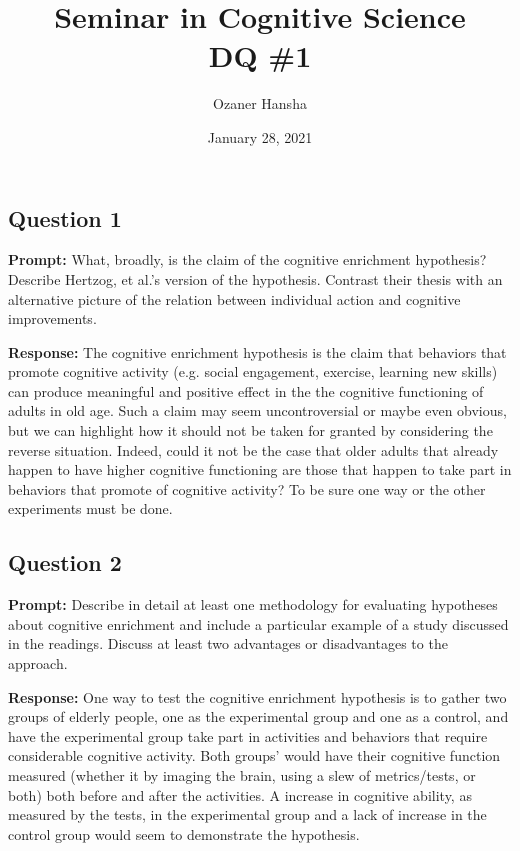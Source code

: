 \documentclass{article}
\begin{document}
\title{Seminar in Cognitive Science\\ DQ \#1}
\author{Ozaner Hansha}
\date{January 28, 2021}
\maketitle

\subsection*{Question 1}
\noindent\textbf{Prompt:} What, broadly, is the claim of the cognitive enrichment hypothesis? Describe Hertzog, et al.’s version of the hypothesis. Contrast their thesis with an alternative picture of the relation between individual action and cognitive improvements.
\bigskip

\noindent\textbf{Response:} The cognitive enrichment hypothesis is the claim that behaviors that promote cognitive activity (e.g. social engagement, exercise, learning new skills) can produce meaningful and positive effect in the the cognitive functioning of adults in old age. Such a claim may seem uncontroversial or maybe even obvious, but we can highlight how it should not be taken for granted by considering the reverse situation. Indeed, could it not be the case that older adults that already happen to have higher cognitive functioning are those that happen to take part in behaviors that promote of cognitive activity? To be sure one way or the other experiments must be done.

\subsection*{Question 2}
\noindent\textbf{Prompt:} Describe in detail at least one methodology for evaluating hypotheses about cognitive enrichment and include a particular example of a study discussed in the readings. Discuss at least two advantages or disadvantages to the approach.
\bigskip

\noindent\textbf{Response:} One way to test the cognitive enrichment hypothesis is to gather two groups of elderly people, one as the experimental group and one as a control, and have the experimental group take part in activities and behaviors that require considerable cognitive activity. Both groups' would have their cognitive function measured (whether it by imaging the brain, using a slew of metrics/tests, or both) both before and after the activities. A increase in cognitive ability, as measured by the tests, in the experimental group and a lack of increase in the control group would seem to demonstrate the hypothesis.
\end{document}
